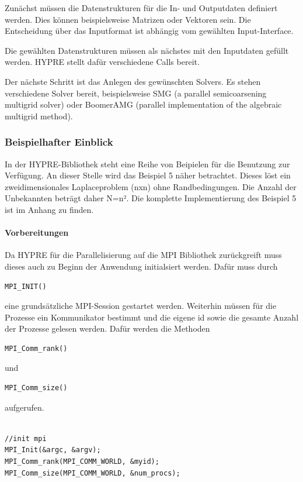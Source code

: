 \documentclass[a4paper,10pt]{article}
\numberwithin{figure}{section}
\numberwithin{table}{section}
\begin{document}
Zunächst müssen die Datenstrukturen für die In- und Outputdaten definiert werden.
Dies können beispielsweise Matrizen oder Vektoren sein.
Die Entscheidung über das Inputformat ist abhängig vom gewählten Input-Interface.

Die gewählten Datenstrukturen müssen als nächstes mit den Inputdaten gefüllt werden.
HYPRE stellt dafür verschiedene Calls bereit.

Der nächste Schritt ist das Anlegen des gewünschten Solvers.
Es stehen verschiedene Solver bereit\cite{hypreManual}, beispielsweise SMG (a parallel semicoarsening multigrid solver) oder BoomerAMG (parallel implementation of the algebraic multigrid method).

\subsubsection{Beispielhafter Einblick}

In der HYPRE-Bibliothek steht eine Reihe von Beipielen für die Benutzung zur Verfügung.
An dieser Stelle wird das Beispiel 5 näher betrachtet.
Dieses löst ein zweidimensionales Laplaceproblem (nxn) ohne Randbedingungen.
Die Anzahl der Unbekannten beträgt daher N=n².
Die komplette Implementierung des Beispiel 5 ist im Anhang zu finden.

\paragraph{Vorbereitungen}

Da HYPRE für die Parallelisierung auf die MPI Bibliothek zurückgreift muss dieses auch zu Beginn der Anwendung initialsiert werden.
Dafür muss durch \begin{verbatim}MPI_INIT()\end{verbatim} eine grundsätzliche MPI-Session gestartet werden.
Weiterhin müssen für die Prozesse ein Kommunikator bestimmt und die eigene id sowie die gesamte Anzahl der Prozesse gelesen werden.
Dafür werden die Methoden \begin{verbatim}MPI_Comm_rank()\end{verbatim} und \begin{verbatim}MPI_Comm_size()\end{verbatim} aufgerufen.

\begin{lstlisting}[frame=single,caption=HYPRE Nutzung: Vorbereitungen, breaklines=true]

//init mpi
MPI_Init(&argc, &argv);
MPI_Comm_rank(MPI_COMM_WORLD, &myid);
MPI_Comm_size(MPI_COMM_WORLD, &num_procs);

\end{lstlisting}
\end{document}
